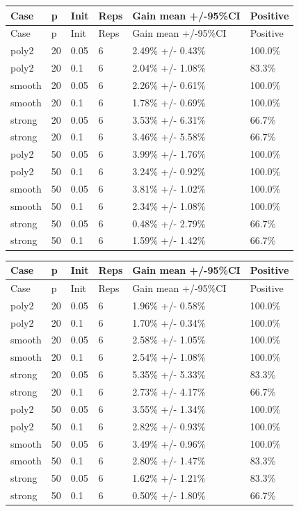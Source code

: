 \documentclass[UTF8,a4paper,11pt]{ctexart}
\begin{document}
\begin{longtable}{p{}p{}p{}p{}p{}p{}}
\toprule
Case & p & Init & Reps & Gain mean +/-95\%CI & Positive \\
\midrule
\endfirsthead
\toprule
Case & p & Init & Reps & Gain mean +/-95\%CI & Positive \\
\midrule
\endhead
poly2 & 20 & 0.05 & 6 & 2.49\% +/- 0.43\% & 100.0\% \\
poly2 & 20 & 0.1 & 6 & 2.04\% +/- 1.08\% & 83.3\% \\
smooth & 20 & 0.05 & 6 & 2.26\% +/- 0.61\% & 100.0\% \\
smooth & 20 & 0.1 & 6 & 1.78\% +/- 0.69\% & 100.0\% \\
strong & 20 & 0.05 & 6 & 3.53\% +/- 6.31\% & 66.7\% \\
strong & 20 & 0.1 & 6 & 3.46\% +/- 5.58\% & 66.7\% \\
poly2 & 50 & 0.05 & 6 & 3.99\% +/- 1.76\% & 100.0\% \\
poly2 & 50 & 0.1 & 6 & 3.24\% +/- 0.92\% & 100.0\% \\
smooth & 50 & 0.05 & 6 & 3.81\% +/- 1.02\% & 100.0\% \\
smooth & 50 & 0.1 & 6 & 2.34\% +/- 1.08\% & 100.0\% \\
strong & 50 & 0.05 & 6 & 0.48\% +/- 2.79\% & 66.7\% \\
strong & 50 & 0.1 & 6 & 1.59\% +/- 1.42\% & 66.7\% \\
\bottomrule
\end{longtable}

\begin{longtable}{p{}p{}p{}p{}p{}p{}}
\toprule
Case & p & Init & Reps & Gain mean +/-95\%CI & Positive \\
\midrule
\endfirsthead
\toprule
Case & p & Init & Reps & Gain mean +/-95\%CI & Positive \\
\midrule
\endhead
poly2 & 20 & 0.05 & 6 & 1.96\% +/- 0.58\% & 100.0\% \\
poly2 & 20 & 0.1 & 6 & 1.70\% +/- 0.34\% & 100.0\% \\
smooth & 20 & 0.05 & 6 & 2.58\% +/- 1.05\% & 100.0\% \\
smooth & 20 & 0.1 & 6 & 2.54\% +/- 1.08\% & 100.0\% \\
strong & 20 & 0.05 & 6 & 5.35\% +/- 5.33\% & 83.3\% \\
strong & 20 & 0.1 & 6 & 2.73\% +/- 4.17\% & 66.7\% \\
poly2 & 50 & 0.05 & 6 & 3.55\% +/- 1.34\% & 100.0\% \\
poly2 & 50 & 0.1 & 6 & 2.82\% +/- 0.93\% & 100.0\% \\
smooth & 50 & 0.05 & 6 & 3.49\% +/- 0.96\% & 100.0\% \\
smooth & 50 & 0.1 & 6 & 2.80\% +/- 1.47\% & 83.3\% \\
strong & 50 & 0.05 & 6 & 1.62\% +/- 1.21\% & 83.3\% \\
strong & 50 & 0.1 & 6 & 0.50\% +/- 1.80\% & 66.7\% \\
\bottomrule
\end{longtable}
\end{document}
